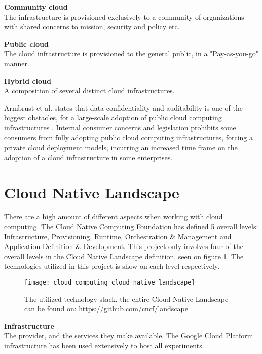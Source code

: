 \textbf{Community cloud}\\
The infrastructure is provisioned exclusively to a community of organizations with shared concerns to mission, security and policy etc.

\textbf{Public cloud}\\
The cloud infrastructure is provisioned to the general public, in a "Pay-as-you-go" manner.

\textbf{Hybrid cloud}\\
A composition of several distinct cloud infrastructures.


Armbrust et al. states that data confidentiality and auditability is one of the biggest obstacles, for a large-scale adoption of public cloud computing infrastructures \cite{armbrust2010view}. Internal consumer concerns and legislation prohibits some consumers from fully adopting public cloud computing infrastructures, forcing a private cloud deployment models, incurring an increased time frame on the adoption of a cloud infrastructure in some enterprises.

\section{Cloud Native Landscape}
There are a high amount of different aspects when working with cloud computing. The Cloud Native Computing Foundation has defined 5 overall levels: Infrastructure, Provisioning, Runtime, Orchestration \& Management and Application Definition \& Development. This project only involves four of the overall levels in the Cloud Native Landscape definition, seen on figure \ref{fig:cloud_computing_cloud_native_landscape}. The technologies utilized in this project is show on each level respectively.

\begin{figure}[!htb]
\begin{center}
  \texttt{[image: cloud\_computing\_cloud\_native\_landscape]}  
  \caption{The utilized technology stack, the entire Cloud Native Landscape can be found on: \url{https://github.com/cncf/landscape}}
  \label{fig:cloud_computing_cloud_native_landscape}
\end{center}
\end{figure}

\textbf{Infrastructure} \\
The provider, and the services they make available. The Google Cloud Platform infrastructure has been used extensively to host all experiments.

